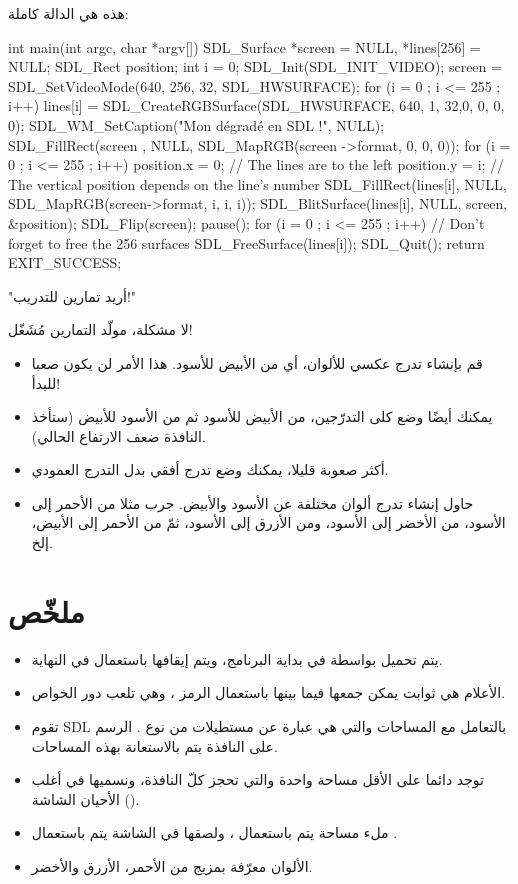 هذه هي الدالة
كاملة:

\begin{Csource}
int main(int argc, char *argv[])
{
	SDL_Surface *screen = NULL, *lines[256] = {NULL};
	SDL_Rect position;
	int i = 0;
	SDL_Init(SDL_INIT_VIDEO);
	screen = SDL_SetVideoMode(640, 256, 32, SDL_HWSURFACE);
	for (i = 0 ; i <= 255 ; i++)
		lines[i] = SDL_CreateRGBSurface(SDL_HWSURFACE, 640, 1, 32,0, 0, 0, 0);
	SDL_WM_SetCaption("Mon dégradé en SDL !", NULL);
	SDL_FillRect(screen , NULL, SDL_MapRGB(screen ->format, 0, 0, 0));
	for (i = 0 ; i <= 255 ; i++)
	{
		position.x = 0; // The lines are to the left
		position.y = i; // The vertical position depends on the line's number
		SDL_FillRect(lines[i], NULL, SDL_MapRGB(screen->format, i, i, i));
		SDL_BlitSurface(lines[i], NULL, screen, &position);
	}
	SDL_Flip(screen);
	pause();
	for (i = 0 ; i <= 255 ; i++) // Don't forget to free the 256 surfaces
		SDL_FreeSurface(lines[i]);
	SDL_Quit();
	return EXIT_SUCCESS;
}
\end{Csource}

{\large"أريد تمارين للتدريب!"}

لا مشكلة، مولّد التمارين مُشَغّل!

\begin{itemize}
	\item قم بإنشاء تدرج عكسي للألوان، أي من الأبيض للأسود. هذا الأمر لن يكون صعبا للبدأ!
	\item يمكنك أيضًا وضع كلى التدرّجين، من الأبيض للأسود ثم من الأسود للأبيض (ستأخذ النافذة ضعف الارتفاع الحالي).
	\item أكثر صعوبة قليلا، يمكنك وضع تدرج أفقي بدل التدرج العمودي.
	\item حاول إنشاء تدرج ألوان مختلفة عن الأسود والأبيض. جرب مثلا من الأحمر إلى الأسود، من الأخضر إلى الأسود، ومن الأزرق إلى الأسود، ثمّ من الأحمر إلى الأبيض، إلخ.
\end{itemize}

\section*{ملخّص}

\begin{itemize}
	\item يتم تحميل 
	بواسطة 
	في بداية البرنامج، ويتم إيقافها باستعمال
	في النهاية.
	\item الأعلام هي ثوابت يمكن جمعها فيما بينها باستعمال الرمز 
	\InlineCode{|}،
	 وهي تلعب دور الخواص.
	\item تقوم \textenglish{SDL}
	بالتعامل مع المساحات والتي هي عبارة عن مستطيلات من نوع 
	.
	الرسم على النافذة يتم بالاستعانة بهذه المساحات.
	\item توجد دائما على الأقل مساحة واحدة والتي تحجز كلّ النافذة، ونسميها في أغلب الأحيان الشاشة 
	().
	\item ملء مساحة يتم باستعمال
	،
	ولصقها في الشاشة يتم باستعمال
	.
	\item الألوان معرّفة بمزيج من الأحمر، الأزرق والأخضر.
\end{itemize}
